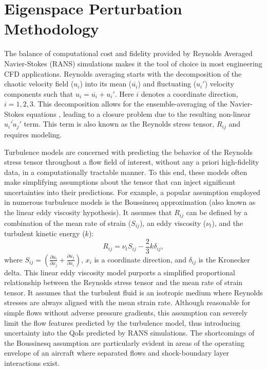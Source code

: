 \section{Eigenspace Perturbation Methodology} \label{sec:equips_rans_uq}

The balance of computational cost and fidelity provided by Reynolds Averaged Navier-Stokes (RANS) simulations makes it the tool of choice in most engineering CFD applications.
Reynolds averaging starts with the decomposition of the chaotic velocity field ($ u_i$) into its mean ($\overline{u_i}$) and fluctuating ($u_i'$) velocity components such that $u_i = \overline{u_i} + u_i'$. Here $i$ denotes a coordinate direction, $i=1, 2, 3$.
This decomposition allows for the ensemble-averaging of the Navier-Stokes equations \cite{pope_2000}, leading to a closure problem due to the resulting non-linear $\overline{u_i'u_j'}$ term.
This term is also known as the Reynolds stress tensor, $R_{ij}$ and requires modeling. 

Turbulence models are concerned with predicting the behavior of the Reynolds stress tensor throughout a flow field of interest, without any a priori high-fidelity data, in a computationally tractable manner.
To this end, these models often make simplifying assumptions about the tensor that can inject significant uncertainties into their predictions.
For example, a popular assumption employed in numerous turbulence models is the Boussinesq approximation (also known as the linear eddy viscosity hypothesis).
It assumes that $R_{ij}$ can be defined by a combination of the mean rate of strain ($S_{ij}$), an eddy viscosity ($\nu_t$), and the turbulent kinetic energy ($k$):
 \begin{equation}\label{equ:rst}
     R_{ij} = \nu_t S_{ij} - \frac{2}{3} k \delta_{ij},
 \end{equation}
where $S_{ij} = \left ( \frac{\partial \overline{u_i}}{\partial x_j} + \frac{\partial \overline{u_j}}{\partial x_i} \right )$, $x_i$ is a coordinate direction, and $\delta_{ij}$ is the Kronecker delta.
This linear eddy viscosity model purports a simplified proportional relationship between the Reynolds stress tensor and the mean rate of strain tensor.
It assumes that the turbulent fluid is an isotropic medium where Reynolds stresses are always aligned with the mean strain rate.
Although reasonable for simple flows without adverse pressure gradients, this assumption can severely limit the flow features predicted by the turbulence model, thus introducing uncertainty into the QoIs predicted by RANS simulations.
The shortcomings of the Boussinesq assumption are particularly evident in areas of the operating envelope of an aircraft where separated flows and shock-boundary layer interactions exist. 

